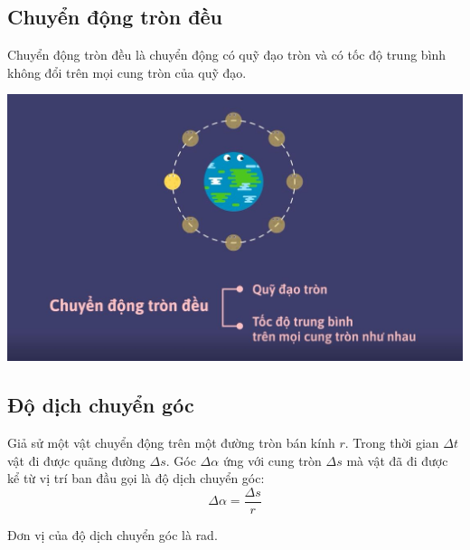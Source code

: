 \subsection{Chuyển động tròn đều}
Chuyển động tròn đều là chuyển động có quỹ đạo tròn và có tốc độ trung bình không đổi trên mọi cung tròn của quỹ đạo. 

\begin{center}
	\includegraphics[scale=0.3]{../figs/VN10-PH-06-L-005-1-V2-03.jpg}
\end{center}
\subsection{Độ dịch chuyển góc}
Giả sử một vật chuyển động trên một đường tròn bán kính $r$. Trong thời gian $\Delta t$ vật đi được quãng đường $\Delta s$. Góc $\Delta \alpha$ ứng với cung tròn $\Delta s$ mà vật đã đi được kể từ vị trí ban đầu gọi là độ dịch chuyển góc:
$$\Delta \alpha = \dfrac{\Delta s}{r}$$

Đơn vị của độ dịch chuyển góc là rad.
